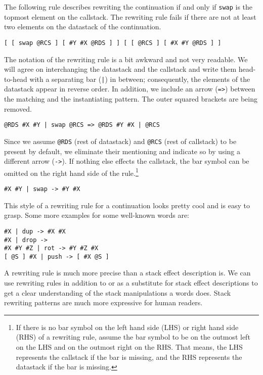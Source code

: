 The following rule describes rewriting the continuation if and only if \verb|swap| is the topmost element on the callstack. The rewriting rule fails if there are not at least two elements on the datastack of the continuation.

\begin{verbatim}
[ [ swap @RCS ] [ #Y #X @RDS ] ] [ [ @RCS ] [ #X #Y @RDS ] ]
\end{verbatim}

The notation of the rewriting rule is a bit awkward and not very readable. We will agree on interchanging the datastack and the callstack and write them head-to-head with a separating bar (\verb!|!) in between; consequently, the elements of the datastack appear in reverse order. In addition, we include an arrow (\verb|=>|) between the matching and the instantiating pattern. The outer squared brackets are being removed.

\begin{verbatim}
@RDS #X #Y | swap @RCS => @RDS #Y #X | @RCS
\end{verbatim}

Since we assume \verb|@RDS| (rest of datastack) and \verb|@RCS| (rest of callstack) to be present by default, we eliminate their mentioning and indicate so by using a different arrow (\verb|->|). If nothing else effects the callstack, the bar symbol can be omitted on the right hand side of the rule.\footnote{If there is no bar symbol on the left hand side (LHS) or right hand side (RHS) of a rewriting rule, assume the bar symbol to be on the outmost left on the LHS and on the outmost right on the RHS. That means, the LHS represents the callstack if the bar is missing, and the RHS represents the datastack if the bar is missing.}

\begin{verbatim}
#X #Y | swap -> #Y #X
\end{verbatim}

This style of a rewriting rule for a continuation looks pretty cool and is easy to grasp. Some more examples for some well-known words are:

\begin{verbatim}
#X | dup -> #X #X
#X | drop -> 
#X #Y #Z | rot -> #Y #Z #X
[ @S ] #X | push -> [ #X @S ]
\end{verbatim}

A rewriting rule is much more precise than a stack effect description is. We can use rewriting rules in addition to or as a substitute for stack effect descriptions to get a clear understanding of the stack manipulations a words does. Stack rewriting patterns are much more expressive for human readers.

